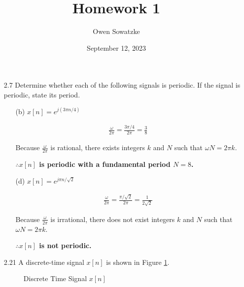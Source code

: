 \documentclass[fleqn]{article}
\title{Homework 1}
\author{Owen Sowatzke}
\date{September 12, 2023}
\begin{document}
	\setlength{\abovedisplayskip}{0pt}
	\setlength{\belowdisplayskip}{0pt}
	\setlength{\abovedisplayshortskip}{0pt}
	\setlength{\belowdisplayshortskip}{0pt}
	\setlength{\mathindent}{0pt}
	\doublespacing
	\maketitle
	
	\begin{enumerate}[nolistsep]
	
		\item[2.7] Determine whether each of the following signals is periodic. If the signal is periodic, state its period.
		
		\begin{enumerate}[nolistsep]
			
			\item[(b)] $x[n] = e^{j({3\pi}n/4)}$
			
			\begin{align*}
			\frac{\omega}{2\pi} = \frac{3\pi/4}{2\pi} = \frac{3}{8}
			\end{align*}
			
			Because $\frac{\omega}{2\pi}$ is rational, there exists integers $k$ and $N$ such that ${\omega}N = 2{\pi}k$.
			
			\textbf{$\therefore x[n]$ is periodic with a fundamental period $N = 8$.}
			
			\item[(d)] $x[n] = e^{j{\pi}n/\sqrt{2}}$
			
			\begin{align*}
			\frac{\omega}{2\pi} = \frac{\pi/\sqrt{2}}{2\pi} = \frac{1}{2\sqrt{2}}
			\end{align*}
			
			Because $\frac{\omega}{2\pi}$ is irrational, there does not exist integers $k$ and $N$ such that ${\omega}N = 2{\pi}k$.
			
			\textbf{$\therefore x[n]$ is not periodic.}
			
		\end{enumerate}
		\item[2.21] A discrete-time signal $x[n]$ is shown in Figure \ref{prob_statement}.
		
	
		\begin{figure}[H]		\centerline{}
		\caption{Discrete Time Signal $x[n]$}
		\label{prob_statement}
		\end{figure}
		

\end{enumerate}
\end{document}

